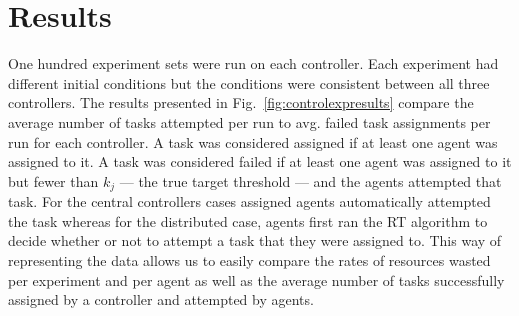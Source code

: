\documentclass[12pt]{book}
\begin{document}
\section{Results}
One hundred experiment sets were run on each controller. Each experiment had different initial conditions but the conditions were consistent between all three controllers. The results presented in Fig.~\ref{fig:controlexpresults} compare the average number of tasks attempted per run to avg. failed task assignments per run for each controller. A task was considered assigned if at least one agent was assigned to it. A task was considered failed if at least one agent was assigned to it but fewer than $k_j$ --- the true target threshold --- and the agents attempted that task. For the central controllers cases assigned agents automatically attempted the task whereas for the distributed case, agents first ran the RT algorithm to decide whether or not to attempt a task that they were assigned to. This way of representing the data allows us to easily compare the rates of resources wasted per experiment and per agent as well as the average number of tasks successfully assigned by a controller and attempted by agents.
\end{document}

